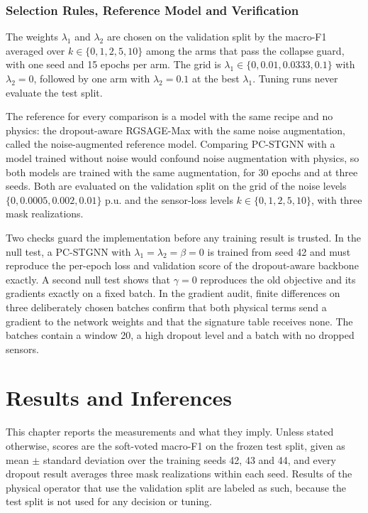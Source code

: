 \documentclass[MTech]{ugthesis}
\begin{document}
\subsection{Selection Rules, Reference Model and Verification}

The weights $\lambda_1$ and $\lambda_2$ are chosen on the validation split by the macro-F1 averaged over $k\in\{0,1,2,5,10\}$ among the arms that pass the collapse guard, with one seed and 15 epochs per arm. The grid is $\lambda_1\in\{0,0.01,0.0333,0.1\}$ with $\lambda_2=0$, followed by one arm with $\lambda_2=0.1$ at the best $\lambda_1$. Tuning runs never evaluate the test split.

The reference for every comparison is a model with the same recipe and no physics: the dropout-aware RGSAGE-Max with the same noise augmentation, called the noise-augmented reference model. Comparing PC-STGNN with a model trained without noise would confound noise augmentation with physics, so both models are trained with the same augmentation, for 30 epochs and at three seeds. Both are evaluated on the validation split on the grid of the noise levels $\{0,0.0005,0.002,0.01\}$ p.u. and the sensor-loss levels $k\in\{0,1,2,5,10\}$, with three mask realizations.

Two checks guard the implementation before any training result is trusted. In the null test, a PC-STGNN with $\lambda_1=\lambda_2=\beta=0$ is trained from seed 42 and must reproduce the per-epoch loss and validation score of the dropout-aware backbone exactly. A second null test shows that $\gamma=0$ reproduces the old objective and its gradients exactly on a fixed batch. In the gradient audit, finite differences on three deliberately chosen batches confirm that both physical terms send a gradient to the network weights and that the signature table receives none. The batches contain a window 20, a high dropout level and a batch with no dropped sensors.



\chapter{Results and Inferences}
\label{chap:results}

This chapter reports the measurements and what they imply. Unless stated otherwise, scores are the soft-voted macro-F1 on the frozen test split, given as mean $\pm$ standard deviation over the training seeds 42, 43 and 44, and every dropout result averages three mask realizations within each seed. Results of the physical operator that use the validation split are labeled as such, because the test split is not used for any decision or tuning.
\end{document}
